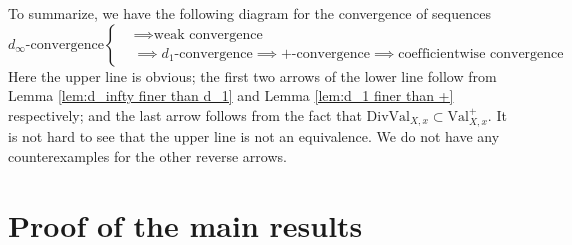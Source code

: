 \documentclass[11pt, leqno]{amsart}%
\theoremstyle{plain}
\theoremstyle{definition}
\theoremstyle{remark}
\newcommand{\Val}{\mathrm{Val}}
\newcommand{\DivVal}{\mathrm{DivVal}}
\numberwithin{equation}{section}
\begin{document}
To summarize, we have the following diagram for the convergence of sequences
\begin{equation*}
d_\infty\text{-convergence}\left\{\begin{aligned}
&\implies\text{weak convergence}\\ 
&\implies d_1\text{-convergence} \implies +\text{-convergence} \implies \text{coefficientwise convergence}
\end{aligned}\right.
\end{equation*}
Here the upper line is obvious; the first two arrows of the lower line follow from Lemma \ref{lem:d_infty finer than d_1} and Lemma \ref{lem:d_1 finer than +} respectively; and the last arrow follows from the fact that $\DivVal_{X,x}\subset \Val^+_{X,x}$. It is not hard to see that the upper line is not an equivalence. We do not have any counterexamples for the other reverse arrows.%

















\section{Proof of the main results}\label{sec:proof}
\end{document}
